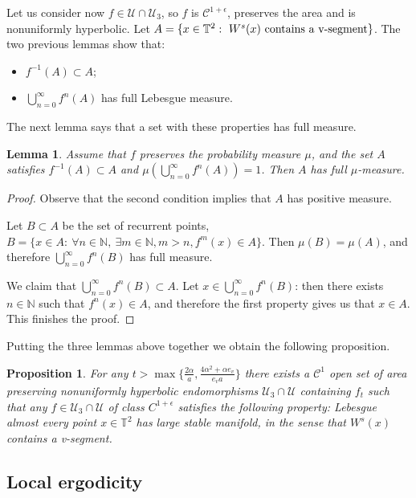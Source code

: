 \documentclass[11pt,letterpaper,reqno]{article}
\newtheorem{proposition}{Proposition}[section]
\newtheorem{lemma}{Lemma}[section]
\newcommand{\N}{\mathbb{N}}
\newcommand{\TT}{\mathbb{T}^2}
\begin{document}
Let us consider now $f\in\mathcal U\cap\mathcal U_3$, so $f$ is $\mathcal C^{1+\epsilon}$, preserves the area and is nonuniformly hyperbolic. Let $A=\{x\in\TT:\ W^s(x) \hbox{ contains a \textit{v}-segment}\}$. The two previous lemmas show that:
\begin{itemize}
\item
$f^{-1}(A)\subset A$;
\item
$\bigcup_{n=0}^{\infty}f^n(A)$ has full Lebesgue measure.
\end{itemize}
The next lemma says that a set with these properties has full measure.

\begin{lemma}
Assume that $f$ preserves the probability measure $\mu$, and the set $A$ satisfies $f^{-1}(A)\subset A$ and $\mu(\bigcup_{n=0}^{\infty}f^n(A))=1$. Then $A$ has full $\mu$-measure.
\end{lemma}

\begin{proof}
Observe that the second condition implies that $A$ has positive measure.

Let $B\subset A$ be the set of recurrent points, $B=\{x\in A:\ \forall n\in\N,\ \exists m\in\N, m>n, f^m(x)\in A\}$. Then $\mu(B)=\mu(A)$, and therefore $\bigcup_{n=0}^{\infty}f^n(B)$ has full measure.

We claim that $\bigcup_{n=0}^{\infty}f^n(B)\subset A$. Let $x\in \bigcup_{n=0}^{\infty}f^n(B)$: then there exists $n\in\N$ such that $f^n(x)\in A$, and therefore the first property gives us that $x\in A$. This finishes the proof.
\end{proof}

Putting the three lemmas above together we obtain the following proposition.

\begin{proposition}\label{cor:largestable}
For any $t>\max\{\frac{2\alpha}a,\frac{4\alpha^2+\alpha e_v}{e_va}\}$ there exists a $\mathcal C^1$ open set of area preserving nonuniformly hyperbolic endomorphisms $\mathcal U_3\cap \mathcal U$ containing $f_t$ such that any $f\in \mathcal U_3\cap\mathcal U$ of class $C^{1+\epsilon}$ satisfies the following property: Lebesgue almost every point $x\in\TT$ has large stable manifold, in the sense that $W^s(x)$ contains a \textit{v}-segment.
\end{proposition}

\color{black}

\subsection{Local ergodicity}
\end{document}
